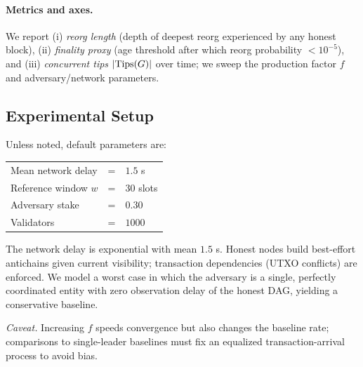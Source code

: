 \paragraph{Metrics and axes.}
We report (i) \emph{reorg length} (depth of deepest reorg experienced by any honest block),
(ii) \emph{finality proxy} (age threshold after which reorg probability $<10^{-5}$),
and (iii) \emph{concurrent tips} $|\mathrm{Tips}(G)|$ over time; we sweep the production factor $f$ and adversary/network parameters.



\subsection{Experimental Setup}\label{sec:setup}
Unless noted, default parameters are:
\begin{center}
\begin{tabular}{lcl}
\toprule
Mean network delay & = & $1.5$ s\\
Reference window $w$ & = & $30$ slots\\
Adversary stake & = & $0.30$ \\
Validators & = & $1000$ \\
\bottomrule
\end{tabular}
\end{center}

The network delay is exponential with mean $1.5$ s. Honest nodes build best-effort antichains given current visibility; transaction dependencies (UTXO conflicts) are enforced. We model a worst case in which the adversary is a single, perfectly coordinated entity with zero observation delay of the honest DAG, yielding a conservative baseline.


\noindent\emph{Caveat.} Increasing $f$ speeds convergence but also changes the baseline rate; comparisons to single-leader baselines must fix an equalized transaction-arrival process to avoid bias.



